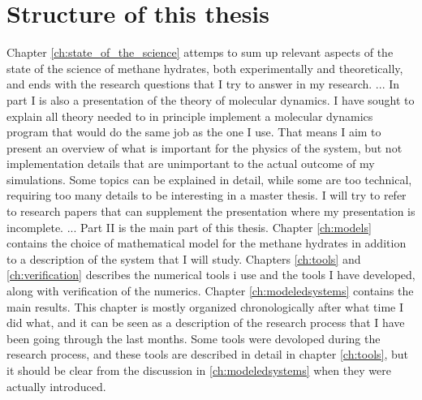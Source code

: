 \section{Structure of this thesis}

Chapter \ref{ch:state_of_the_science} attemps to sum up relevant aspects of the state of the science of methane hydrates, both experimentally and theoretically, and ends with the research questions that I try to answer in my research.
...
In part I is also a presentation of the theory of molecular dynamics. I have sought to explain all theory needed to in principle implement a molecular dynamics program that would do the same job as the one I use. That means I aim to present an overview of what is important for the physics of the system, but not implementation details that are unimportant to the actual outcome of my simulations. Some topics can be explained in detail, while some are too technical, requiring too many details to be interesting in a master thesis. I will try to refer to research papers that can supplement the presentation where my presentation is incomplete.
...
Part II is the main part of this thesis. Chapter \ref{ch:models} contains the choice of mathematical model for the methane hydrates in addition to a description of the system that I will study. Chapters \ref{ch:tools} and \ref{ch:verification} describes the numerical tools i use and the tools I have developed, along with verification of the numerics. Chapter \ref{ch:modeledsystems} contains the main results. This chapter is mostly organized chronologically after what time I did what, and it can be seen as a description of the research process that I have been going through the last months. Some tools were devoloped during the research process, and these tools are described in detail in chapter \ref{ch:tools}, but it should be clear from the discussion in \ref{ch:modeledsystems} when they were actually introduced.


